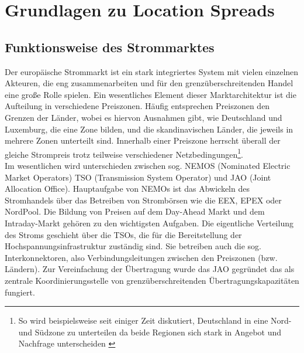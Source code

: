 \section{Grundlagen zu Location Spreads}
\label{sec:Grundlagen zu Location Spreads}



\subsection{Funktionsweise des Strommarktes}
\label{sec:Funktionsweise des Strommarktes}
Der europäische Strommarkt ist ein stark integriertes System mit vielen einzelnen Akteuren, die eng zusammenarbeiten und für den grenzüberschreitenden Handel eine große Rolle spielen. Ein wesentliches Element dieser Marktarchitektur ist die Aufteilung in verschiedene Preiszonen. Häufig entsprechen Preiszonen den Grenzen der Länder, wobei es hiervon Ausnahmen gibt, wie Deutschland und Luxemburg, die eine Zone bilden, und die skandinavischen Länder, die jeweils in mehrere Zonen unterteilt sind. Innerhalb einer Preiszone herrscht überall der gleiche Strompreis trotz teilweise verschiedener Netzbedingungen\footnote{So wird beispielsweise seit einiger Zeit diskutiert, Deutschland in eine Nord- und Südzone zu unterteilen da beide Regionen sich stark in Angebot und Nachfrage unterscheiden \cite{17}}.\\
Im wesentlichen wird unterschieden zwischen sog. NEMOS (Nominated Electric Market Operators) TSO (Transmission System Operator) und JAO (Joint Allocation Office). Hauptaufgabe von NEMOs ist das Abwickeln des Stromhandels über das Betreiben von Strombörsen wie die EEX, EPEX oder NordPool. Die Bildung von Preisen auf dem Day-Ahead Markt und dem Intraday-Markt gehören zu den wichtigsten Aufgaben. Die eigentliche Verteilung des Stroms geschieht über die TSOs, die für die Bereitstellung der Hochspannungsinfrastruktur zuständig sind. Sie betreiben auch die sog. Interkonnektoren, also Verbindungsleitungen zwischen den Preiszonen (bzw. Ländern). Zur Vereinfachung der Übertragung wurde das JAO gegründet das als zentrale Koordinierungsstelle von grenzüberschreitenden Übertragungskapazitäten fungiert. \\
